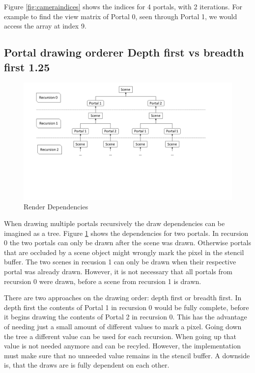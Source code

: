 Figure \ref{fig:cameraindices} shows the indices for 4 portals, with 2 iterations. For example to find the view matrix of Portal 0, seen through Portal 1, we would access the array at index 9.


\subsection{Portal drawing orderer Depth first vs breadth first 1.25}

\begin{figure}[h]
	\includegraphics[width=\linewidth]{images/rendertree.png}
	\caption{Render Dependencies}
	\label{fig:rendertree}
\end{figure}

When drawing multiple portals recursively the draw dependencies can be imagined as a tree. Figure \ref{fig:rendertree} shows the dependencies for two portals. In recursion 0 the two portals can only be drawn after the scene was drawn. Otherwise portals that are occluded by a scene object might wrongly mark the pixel in the stencil buffer. The two scenes in recusion 1 can only be drawn when their respective portal was already drawn. However, it is not necessary that all portals from recursion 0 were drawn, before a scene from recursion 1 is drawn.

There are two approaches on the drawing order: depth first or breadth first. In depth first the contents of Portal 1 in recursion 0 would be fully complete, before it begins drawing the contents of Portal 2 in recursion 0. This has the advantage of needing just a small amount of different values to mark a pixel. Going down the tree a different value can be used for each recursion. When going up that value is not needed anymore and can be recyled. However, the implementation must make sure that no unneeded value remains in the stencil buffer. A downside is, that the draws are is fully dependent on each other.

